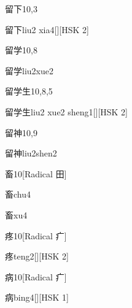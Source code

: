 \begin{entry}{留下}{10,3}
  \begin{phonetics}{留下}{liu2 xia4}[][HSK 2]
  \end{phonetics}
\end{entry}

\begin{entry}{留学}{10,8}
  \begin{phonetics}{留学}{liu2xue2}
  \end{phonetics}
\end{entry}

\begin{entry}{留学生}{10,8,5}
  \begin{phonetics}{留学生}{liu2 xue2 sheng1}[][HSK 2]
  \end{phonetics}
\end{entry}

\begin{entry}{留神}{10,9}
  \begin{phonetics}{留神}{liu2shen2}
  \end{phonetics}
\end{entry}

\begin{entry}{畜}{10}[Radical ⽥]
  \begin{phonetics}{畜}{chu4}
  \end{phonetics}
  \begin{phonetics}{畜}{xu4}
  \end{phonetics}
\end{entry}

\begin{entry}{疼}{10}[Radical 疒]
  \begin{phonetics}{疼}{teng2}[][HSK 2]
  \end{phonetics}
\end{entry}

\begin{entry}{病}{10}[Radical 疒]
  \begin{phonetics}{病}{bing4}[][HSK 1]
  \end{phonetics}
\end{entry}

